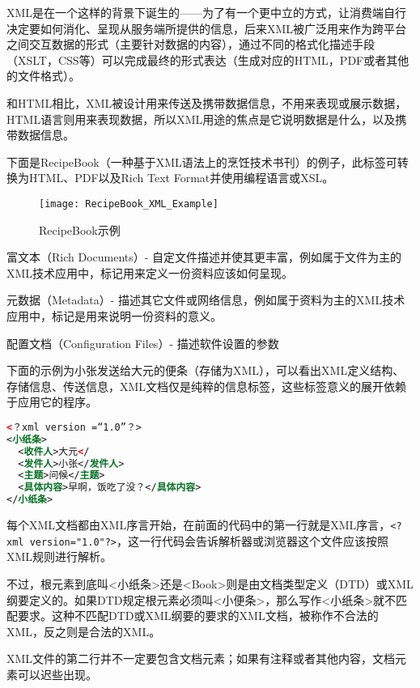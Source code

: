 XML是在一个这样的背景下诞生的——为了有一个更中立的方式，让消费端自行决定要如何消化、呈现从服务端所提供的信息，后来XML被广泛用来作为跨平台之间交互数据的形式（主要针对数据的内容），通过不同的格式化描述手段（XSLT，CSS等）可以完成最终的形式表达（生成对应的HTML，PDF或者其他的文件格式）。

和HTML相比，XML被设计用来传送及携带数据信息，不用来表现或展示数据，HTML语言则用来表现数据，所以XML用途的焦点是它说明数据是什么，以及携带数据信息。

下面是RecipeBook（一种基于XML语法上的烹饪技术书刊）的例子，此标签可转换为HTML、PDF以及Rich Text Format并使用编程语言或XSL。
\begin{figure}[htbp]
\centering
\texttt{[image: RecipeBook\_XML\_Example]}
\caption{RecipeBook示例}
\end{figure}



\begin{compactitem}
\item 富文本（Rich Documents）- 自定文件描述并使其更丰富，例如属于文件为主的XML技术应用中，标记用来定义一份资料应该如何呈现。

\item 元数据（Metadata）- 描述其它文件或网络信息，例如属于资料为主的XML技术应用中，标记是用来说明一份资料的意义。

\item 配置文档（Configuration Files）- 描述软件设置的参数

\end{compactitem}

下面的示例为小张发送给大元的便条（存储为XML），可以看出XML定义结构、存储信息、传送信息，XML文档仅是纯粹的信息标签，这些标签意义的展开依赖于应用它的程序。

\begin{lstlisting}[language=XML]
<？xml version =“1.0”？>
<小纸条>
  <收件人>大元</
  <发件人>小张</发件人>
  <主题>问候</主题>
  <具体内容>早啊，饭吃了没？</具体内容>
</小纸条>
\end{lstlisting}


每个XML文档都由XML序言开始，在前面的代码中的第一行就是XML序言，\texttt{<?xml version="1.0"?>}，这一行代码会告诉解析器或浏览器这个文件应该按照XML规则进行解析。


不过，根元素到底叫<小纸条>还是<Book>则是由文档类型定义（DTD）或XML纲要定义的。如果DTD规定根元素必须叫<小便条>，那么写作<小纸条>就不匹配要求。这种不匹配DTD或XML纲要的要求的XML文档，被称作不合法的XML，反之则是合法的XML。


XML文件的第二行并不一定要包含文档元素；如果有注释或者其他内容，文档元素可以迟些出现。


